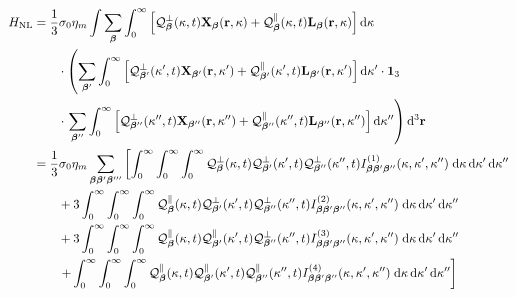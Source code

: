 \documentclass{article}
\begin{document}
\begin{equation}\label{eq:HNL2}
\begin{split}
H_\mathrm{NL} &= \frac{1}{3}\sigma_0\eta_m\int\sum_{\bm{\beta}}\int_0^\infty\left[\mathcal{Q}_{\bm{\beta}}^\perp(\kappa,t)\mathbf{X}_{\bm{\beta}}(\mathbf{r},\kappa) + \mathcal{Q}_{\bm{\beta}}^\parallel(\kappa,t)\mathbf{L}_{\bm{\beta}}(\mathbf{r},\kappa)\right]\mathrm{d}\kappa\\
&\qquad\cdot\left(\sum_{\bm{\beta}'}\int_0^\infty\left[\mathcal{Q}_{\bm{\beta}'}^\perp(\kappa',t)\mathbf{X}_{\bm{\beta}'}(\mathbf{r},\kappa') + \mathcal{Q}_{\bm{\beta}'}^\parallel(\kappa',t)\mathbf{L}_{\bm{\beta}'}(\mathbf{r},\kappa')\right]\mathrm{d}\kappa'\cdot\bm{1}_3\right.\\
&\qquad\cdot\left.\sum_{\bm{\beta}''}\int_0^\infty\left[\mathcal{Q}_{\bm{\beta}''}^\perp(\kappa'',t)\mathbf{X}_{\bm{\beta}''}(\mathbf{r},\kappa'') + \mathcal{Q}_{\bm{\beta}''}^\parallel(\kappa'',t)\mathbf{L}_{\bm{\beta}''}(\mathbf{r},\kappa'')\right]\mathrm{d}\kappa''\right)\mathrm{d}^3\mathbf{r}\\
&= \frac{1}{3}\sigma_0\eta_m\sum_{\bm{\beta}\bm{\beta}'\bm{\beta}'''}\left[\int_0^\infty\int_0^\infty\int_0^\infty\mathcal{Q}_{\bm{\beta}}^\perp(\kappa,t)\mathcal{Q}_{\bm{\beta}'}^\perp(\kappa',t)\mathcal{Q}_{\bm{\beta}''}^\perp(\kappa'',t)I_{\bm{\beta}\bm{\beta}'\bm{\beta}''}^{(1)}(\kappa,\kappa',\kappa'')\;\mathrm{d}\kappa\,\mathrm{d}\kappa'\,\mathrm{d}\kappa''\right.\\
&\qquad + 3\int_0^\infty\int_0^\infty\int_0^\infty\mathcal{Q}_{\bm{\beta}}^\parallel(\kappa,t)\mathcal{Q}_{\bm{\beta}'}^\perp(\kappa',t)\mathcal{Q}_{\bm{\beta}''}^\perp(\kappa'',t)I_{\bm{\beta}\bm{\beta}'\bm{\beta}''}^{(2)}(\kappa,\kappa',\kappa'')\;\mathrm{d}\kappa\,\mathrm{d}\kappa'\,\mathrm{d}\kappa''\\
&\qquad + 3\int_0^\infty\int_0^\infty\int_0^\infty\mathcal{Q}_{\bm{\beta}}^\parallel(\kappa,t)\mathcal{Q}_{\bm{\beta}'}^\parallel(\kappa',t)\mathcal{Q}_{\bm{\beta}''}^\perp(\kappa'',t)I_{\bm{\beta}\bm{\beta}'\bm{\beta}''}^{(3)}(\kappa,\kappa',\kappa'')\;\mathrm{d}\kappa\,\mathrm{d}\kappa'\,\mathrm{d}\kappa''\\
&\qquad\left. + \int_0^\infty\int_0^\infty\int_0^\infty\mathcal{Q}_{\bm{\beta}}^\parallel(\kappa,t)\mathcal{Q}_{\bm{\beta}'}^\parallel(\kappa',t)\mathcal{Q}_{\bm{\beta}''}^\parallel(\kappa'',t)I_{\bm{\beta}\bm{\beta}'\bm{\beta}''}^{(4)}(\kappa,\kappa',\kappa'')\;\mathrm{d}\kappa\,\mathrm{d}\kappa'\,\mathrm{d}\kappa'' \vphantom{\int_0^\infty} \right]
\end{split}
\end{equation}
\end{document}
